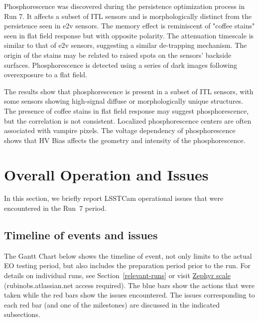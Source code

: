 Phosphorescence was discovered during the persistence optimization process in Run 7. It affects a subset of ITL sensors and is morphologically distinct from the persistence seen in e2v sensors. The memory effect is reminiscent of "coffee stains" seen in flat field response but with opposite polarity. The attenuation timescale is similar to that of e2v sensors, suggesting a similar de-trapping mechanism. The origin of the stains may be related to raised spots on the sensors' backside surfaces. Phosphorescence is detected using a series of dark images following overexposure to a flat field. 

The results show that phosphorescence is present in a subset of ITL sensors, with some sensors showing high-signal diffuse or morphologically unique structures. The presence of coffee stains in flat field response may suggest phosphorescence, but the correlation is not consistent. Localized phosphorescence centers are often associated with vampire pixels. The voltage dependency of phosphorescence shows that HV Bias affects the geometry and intensity of the phosphorescence.

\clearpage

\section{Overall Operation and Issues}\label{sec:issues}
In this section, we briefly report LSSTCam operational issues that were encountered in the Run~7 period.

\subsection{Timeline of events and issues}\label{ganttchart}

The Gantt Chart below shows the timeline of event, not only limits to the actual EO testing period, but also includes the preparation period prior to the run. For details on individual runs, see Section~\ref{relevant-runs} or visit \href{https://rubinobs.atlassian.net/projects/BLOCK?selectedItem=com.atlassian.plugins.atlassian-connect-plugin:com.kanoah.test-manager__main-project-page#!/reports/testresults/list/view?tql=testResult.projectId%20IN%20(10064)%20AND%20testPlan.key%20IN%20(%22BLOCK-P15%22)%20AND%20testPlan.onlyLastTestResult%20IS%20true&epicJQL=&title=Test%20execution%20results%20(list)&projectId=10064&traceabilityReportOption=COVERAGE_TEST_CASES&traceabilityTreeOption=COVERAGE_TEST_CASES&traceabilityCustomTreeDisplayOption=CONDENSED&traceabilityMatrixOption=COVERAGE_TEST_CASES&scorecardOption=EXECUTION_RESULTS&displayUnit=COUNT&period=MONTH}{Zephyr scale} (rubinobs.atlassian.net access required).
The blue bars show the actions that were taken while the red bars show the issues encountered. The issues corresponding to each red bar (and one of the milestones) are discussed in the indicated subsections.


